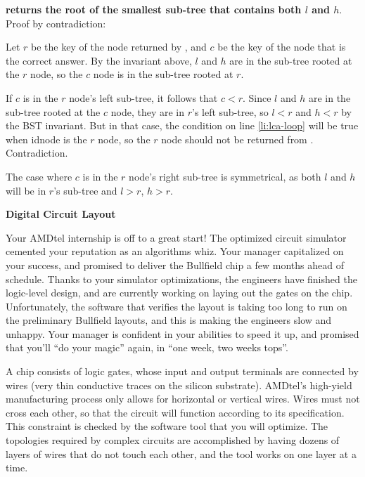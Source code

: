 \documentclass[12pt,twoside]{article}
\begin{document}
\begin{problems}
\begin{problemparts}
{  \textbf{ returns the root of the smallest sub-tree that contains
  both $l$ and $h$}. Proof by contradiction:
  
  Let $r$ be the key of the node returned by , and $c$ be the key of
  the node that is the correct answer. By the invariant above, $l$ and $h$ are
  in the sub-tree rooted at the $r$ node, so the $c$ node is in the sub-tree
  rooted at $r$.
  
  If $c$ is in the $r$ node's left sub-tree, it follows that $c < r$. Since $l$
  and $h$ are in the sub-tree rooted at the $c$ node, they are in $r$'s left
  sub-tree, so $l < r$ and $h < r$ by the BST invariant. But in that case, the
  condition on line \ref{li:lca-loop} will be true when id{node} is the $r$
  node, so the $r$ node should not be returned from . Contradiction.
  
  The case where $c$ is in the $r$ node's right sub-tree is symmetrical, as both
  $l$ and $h$ will be in $r$'s sub-tree and $l > r$, $h > r$.
}
\end{problemparts}

\newpage

\problem {} \textbf{Digital Circuit Layout}

Your AMDtel internship is off to a great start! The optimized circuit simulator
cemented your reputation as an algorithms whiz. Your manager capitalized on your
success, and promised to deliver the Bullfield chip a few months ahead of
schedule. Thanks to your simulator optimizations, the engineers have finished
the logic-level design, and are currently working on laying out the gates on the
chip. Unfortunately, the software that verifies the layout is taking too long to
run on the preliminary Bullfield layouts, and this is making the engineers slow
and unhappy. Your manager is confident in your abilities to speed it up, and
promised that you'll ``do your magic'' again, in ``one week, two weeks tops''.

A chip consists of logic gates, whose input and output terminals are connected
by wires (very thin conductive traces on the silicon substrate). AMDtel's
high-yield manufacturing process only allows for horizontal or vertical wires.
Wires must not cross each other, so that the circuit will function according to
its specification. This constraint is checked by the software tool that you
will optimize. The topologies required by complex circuits are accomplished by
having dozens of layers of wires that do not touch each other, and the tool
works on one layer at a time.


\end{problems}
\end{document}
